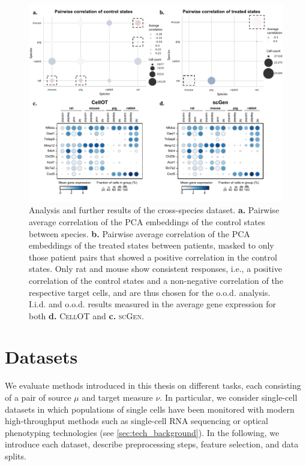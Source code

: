 \begin{figure}[H]
     \centering
     \includegraphics[width=\textwidth]{figures/fig_crossspecies_ood_analysis.pdf}
     \caption{ Analysis and further results of the cross-species dataset. \textbf{a.} Pairwise average correlation of the PCA embeddings of the control states between species. \textbf{b.} Pairwise average correlation of the PCA embeddings of the treated states between patients, masked to only those patient pairs that showed a positive correlation in the control states. Only rat and mouse show consistent responses, i.e., a positive correlation of the control states and a non-negative correlation of the respective target cells, and are thus chosen for the o.o.d. analysis. I.i.d. and o.o.d. results measured in the average gene expression for both \textbf{d.} \textsc{CellOT} and \textbf{c.} \textsc{scGen}.}
     \label{fig:crossspecies_ood_analysis}
\end{figure}

\section{Datasets} \label{app:datasets}

We evaluate methods introduced in this thesis on different tasks, each consisting of a pair of source $\mu$ and target measure $\nu$.
In particular, we consider single-cell datasets in which populations of single cells have been monitored with modern high-throughput methods such as single-cell RNA sequencing or optical phenotyping technologies (see \cref{sec:tech_background}).
In the following, we introduce each dataset, describe preprocessing steps, feature selection, and data splits.

